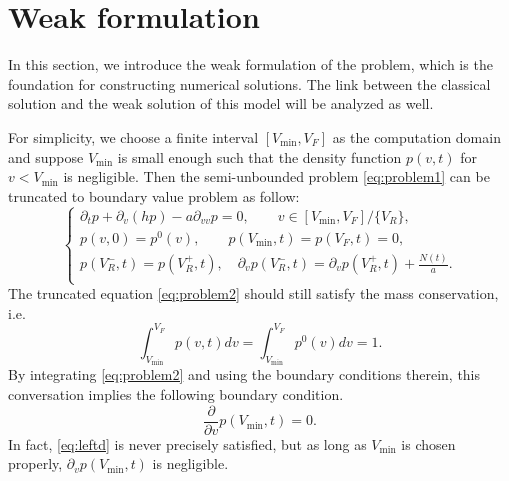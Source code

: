 \section{Weak formulation}\label{sec:weak_form}


In this section, we introduce the weak formulation of the problem, which is the foundation for constructing numerical solutions. The link between 
the classical solution and the weak solution of this model will be analyzed as well.


For simplicity, we choose a finite interval $[V_{\min}, V_F]$ as the computation domain and suppose $V_{\min}$ is small enough such that the density function $p(v,t)$ for  $v < V_{\min}$ is negligible. Then the semi-unbounded problem \eqref{eq:problem1} can be truncated to boundary value problem as follow:
\begin{equation}
    \label{eq:problem2}
    \begin{cases}
        \partial_{t}p+\partial_{v}(hp)-a\partial_{v v}p=0,\qquad v\in[V_{\min},V_F]/\{V_R\},\\
        p(v,0)=p^0(v),\qquad p(V_{\min},t)=p(V_F,t)=0,\\
        p(V^-_R,t)=p(V^+_R,t),\quad \partial _vp(V^-_R,t)=\partial _vp(V^+_R,t)+\frac{N(t)}{a}.\\
    \end{cases}
\end{equation}
The truncated equation \eqref{eq:problem2} should still satisfy the mass conservation, i.e.
\begin{equation}
    \label{eq:mass_conservation}
    \int_{V_{\min}}^{V_{F}} p(v, t) d v=\int_{V_{\min}}^{V_{F}} p^{0}(v) d v=1.
\end{equation}
By integrating \eqref{eq:problem2} and using the boundary conditions therein, this conversation implies the following boundary condition.
\begin{equation}
    \label{eq:leftd}
    \frac{\partial}{\partial v}p(V_{\min},t)=0.
\end{equation}
In fact, \eqref{eq:leftd} is never precisely satisfied, but as long as $V_{\min}$ is chosen properly, $\partial_vp(V_{\min},t)$ is negligible.


